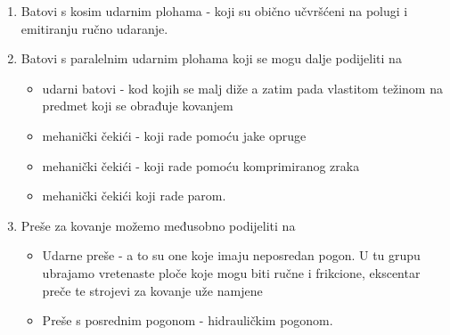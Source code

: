 \documentclass[a4paper,12pt]{article}
\numberwithin{figure}{section}
\begin{document}
\begin{enumerate}
\item Batovi s kosim udarnim plohama - koji su obično učvršćeni na polugi i emitiranju ručno udaranje.
\item Batovi s paralelnim udarnim plohama koji se mogu dalje podijeliti na 
\begin{itemize}
\item udarni batovi - kod kojih se malj diže a zatim pada vlastitom težinom na predmet koji se obrađuje kovanjem
\item mehanički čekići - koji rade pomoću jake opruge
\item mehanički čekići - koji rade pomoću komprimiranog zraka
\item mehanički čekići koji rade parom.
\end{itemize}
\item Preše za kovanje možemo međusobno podijeliti na 
\begin{itemize}
\item Udarne preše - a to su one koje imaju neposredan pogon. U tu grupu ubrajamo vretenaste ploče koje mogu biti ručne i frikcione, ekscentar preče te strojevi za kovanje uže namjene
\item Preše s posrednim pogonom - hidrauličkim pogonom.
\end{itemize}
\end{enumerate}
\end{document}
